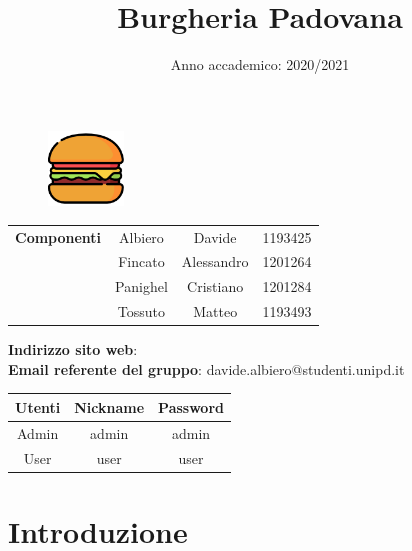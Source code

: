 \documentclass[a4paper, dvipsnames, table]{article}
\begin{document}
\title{Burgheria Padovana}
\date{Anno accademico: 2020/2021}

\newpage  %
\begin{figure}
	\centering
	\includegraphics[width=2cm]{../img/burger-icon.png}%
\end{figure}
\maketitle

\begin{table}
	\centering
	\begin{tabular}{c|c c c}
		\textbf{Componenti}
			& Albiero	& Davide      & 1193425 \\
			& Fincato	& Alessandro  & 1201264 \\
 			& Panighel	& Cristiano   & 1201284 \\
			& Tossuto	& Matteo      & 1193493 \\
	\end{tabular}
\end{table}

\begin{center}
	\textbf{Indirizzo sito web}: \\
	\textbf{Email referente del gruppo}: davide.albiero@studenti.unipd.it
\end{center}

\begin{table}
	\centering
	\begin{tabular}{c|c c}
		\textbf{Utenti} & \textbf{Nickname} & \textbf{Password} \\
		\hline
		Admin           & admin & admin             \\
		User            & user  & user              \\
	\end{tabular}
\end{table}

\newpage
	\tableofcontents

\newpage
\section{Introduzione}
	
	
\end{document}
